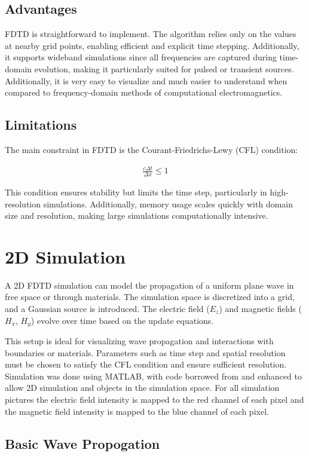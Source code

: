 \documentclass[12pt]{article}
\begin{document}
\begin{spacing}{1.5}
\subsection{Advantages}
FDTD is straightforward to implement. The algorithm relies only on the values at nearby grid points, enabling efficient and explicit time stepping. Additionally, it supports wideband simulations since all frequencies are captured during time-domain evolution, making it particularly suited for pulsed or transient sources. Additionally, it is very easy to visualize and much easier to understand when compared to frequency-domain methods of computational electromagnetics.

\subsection{Limitations}
The main constraint in FDTD is the Courant-Friedrichs-Lewy (CFL) condition:

\begin{align}
	\frac{c \Delta t}{\Delta x} \leq 1
\end{align}

This condition ensures stability but limits the time step, particularly in high-resolution simulations. Additionally, memory usage scales quickly with domain size and resolution, making large simulations computationally intensive.

\section{2D Simulation}
A 2D FDTD simulation can model the propagation of a uniform plane wave in free space or through materials. The simulation space is discretized into a grid, and a Gaussian source is introduced. The electric field ($E_z$) and magnetic fields ($H_x$, $H_y$) evolve over time based on the update equations.

This setup is ideal for visualizing wave propagation and interactions with boundaries or materials. Parameters such as time step and spatial resolution must be chosen to satisfy the CFL condition and ensure sufficient resolution. Simulation was done using MATLAB, with code borrowed from \cite{ece6340lecture14} and enhanced to allow 2D simulation and objects in the simulation space. For all simulation pictures the electric field intensity is mapped to the red channel of each pixel and the magnetic field intensity is mapped to the blue channel of each pixel.


\subsection{Basic Wave Propogation}


\end{spacing}
\end{document}
